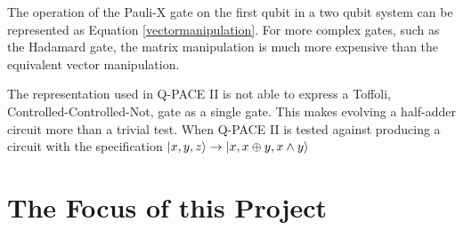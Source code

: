 \documentclass[authoryearcitations]{UoYCSproject}
\begin{document}
The operation of the Pauli-X gate on the first qubit in a two qubit system can be represented as Equation \ref{vectormanipulation}.
For more complex gates, such as the Hadamard gate, the matrix manipulation is much more expensive than the equivalent vector manipulation.

The representation used in Q-PACE II is not able to express a Toffoli, Controlled-Controlled-Not, gate as a single gate.
This makes evolving a half-adder circuit more than a trivial test.
When Q-PACE II is tested against producing a circuit with the specification $\left\vert{x, y, z}\right\rangle\rightarrow\left\vert{x,x \oplus y, x \wedge y}\right\rangle$

\section{The Focus of this Project}


\end{document}
